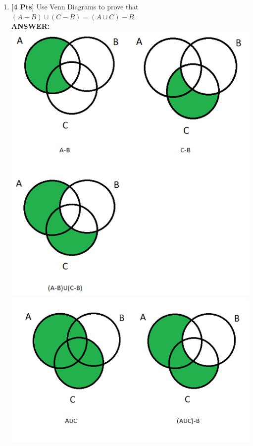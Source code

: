 \documentclass[12pt]{article}
\begin{document}
\begin{enumerate}

\item {\bf [4 Pts]} Use Venn Diagrams to prove that $(A - B) \cup (C - B) = (A \cup C) - B$.\\
\textbf{ANSWER:}\\
\includegraphics{Left}\\
\includegraphics{Right}


\end{enumerate}
\end{document}
